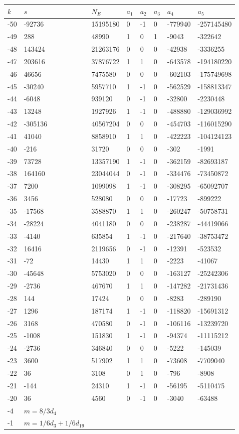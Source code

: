 \documentclass{amsart}
\begin{document}
\begin{longtable}{|l|l|l|lllll|}
\hline
$k$ & $s$ & $N_E$ & $a_1$ & $a_2$ & $a_3$ & $a_4$ & $a_5$\\
\hline
-50&-92736&15195180&0&-1&0&-779940&-257145480\\
-49&288&48990&1&0&1&-9043&-322642\\
-48&143424&21263176&0&0&0&-42938&-3336255\\
-47&203616&37876722&1&1&0&-643578&-194180220\\
-46&46656&7475580&0&0&0&-602103&-175749698\\
-45&-30240&5957710&1&-1&0&-562529&-158813347\\
-44&-6048&939120&0&-1&0&-32800&-2230448\\
-43&13248&1927926&1&-1&0&-488880&-129036992\\
-42&-305136&40567204&0&0&0&-454703&-116015290\\
-41&41040&8858910&1&1&0&-422223&-104124123\\
-40&-216&31720&0&0&0&-302&-1991\\
-39&73728&13357190&1&-1&0&-362159&-82693187\\
-38&164160&23044044&0&-1&0&-334476&-73450872\\
-37&7200&1099098&1&-1&0&-308295&-65092707\\
-36&3456&528080&0&0&0&-17723&-899222\\
-35&-17568&3588870&1&1&0&-260247&-50758731\\
-34&-28224&4041180&0&0&0&-238287&-44419066\\
-33&-4140&635854&1&-1&0&-217640&-38753472\\
-32&16416&2119656&0&-1&0&-12391&-523532\\
-31&-72&14430&1&1&0&-2223&-41067\\
-30&-45648&5753020&0&0&0&-163127&-25242306\\
-29&-2736&467670&1&1&0&-147282&-21731436\\
-28&144&17424&0&0&0&-8283&-289190\\
-27&1296&187174&1&-1&0&-118820&-15691312\\
-26&3168&470580&0&-1&0&-106116&-13239720\\
-25&-1008&151830&1&-1&0&-94374&-11115212\\
-24&-2736&346840&0&0&0&-5222&-145039\\
-23&3600&517902&1&1&0&-73608&-7709040\\
-22&36&3108&0&1&0&-796&-8908\\
-21&-144&24310&1&-1&0&-56195&-5110475\\
-20&36&4560&0&-1&0&-3040&-63488\\
-4&$m=8/3d_{4}$&&\multicolumn{5}{c|}{}\\
-1&$m=1/6d_{3}+1/6d_{19}$&&\multicolumn{5}{c|}{}\\
\hline
\end{longtable}
\end{document}
